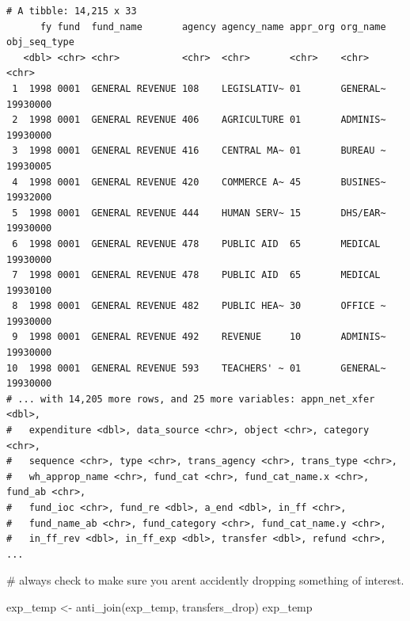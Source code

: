 \documentclass[
  letterpaper,
  DIV=11,
  numbers=noendperiod]{scrreport}
\newenvironment{Shaded}{\begin{snugshade}}{\end{snugshade}}
\newcommand{\CommentTok}[1]{\textcolor[rgb]{0.37,0.37,0.37}{#1}}
\newcommand{\FunctionTok}[1]{\textcolor[rgb]{0.28,0.35,0.67}{#1}}
\newcommand{\NormalTok}[1]{\textcolor[rgb]{0.00,0.23,0.31}{#1}}
\newcommand{\OtherTok}[1]{\textcolor[rgb]{0.00,0.23,0.31}{#1}}
\begin{document}
\begin{verbatim}
# A tibble: 14,215 x 33
      fy fund  fund_name       agency agency_name appr_org org_name obj_seq_type
   <dbl> <chr> <chr>           <chr>  <chr>       <chr>    <chr>    <chr>       
 1  1998 0001  GENERAL REVENUE 108    LEGISLATIV~ 01       GENERAL~ 19930000    
 2  1998 0001  GENERAL REVENUE 406    AGRICULTURE 01       ADMINIS~ 19930000    
 3  1998 0001  GENERAL REVENUE 416    CENTRAL MA~ 01       BUREAU ~ 19930005    
 4  1998 0001  GENERAL REVENUE 420    COMMERCE A~ 45       BUSINES~ 19932000    
 5  1998 0001  GENERAL REVENUE 444    HUMAN SERV~ 15       DHS/EAR~ 19930000    
 6  1998 0001  GENERAL REVENUE 478    PUBLIC AID  65       MEDICAL  19930000    
 7  1998 0001  GENERAL REVENUE 478    PUBLIC AID  65       MEDICAL  19930100    
 8  1998 0001  GENERAL REVENUE 482    PUBLIC HEA~ 30       OFFICE ~ 19930000    
 9  1998 0001  GENERAL REVENUE 492    REVENUE     10       ADMINIS~ 19930000    
10  1998 0001  GENERAL REVENUE 593    TEACHERS' ~ 01       GENERAL~ 19930000    
# ... with 14,205 more rows, and 25 more variables: appn_net_xfer <dbl>,
#   expenditure <dbl>, data_source <chr>, object <chr>, category <chr>,
#   sequence <chr>, type <chr>, trans_agency <chr>, trans_type <chr>,
#   wh_approp_name <chr>, fund_cat <chr>, fund_cat_name.x <chr>, fund_ab <chr>,
#   fund_ioc <chr>, fund_re <dbl>, a_end <dbl>, in_ff <chr>,
#   fund_name_ab <chr>, fund_category <chr>, fund_cat_name.y <chr>,
#   in_ff_rev <dbl>, in_ff_exp <dbl>, transfer <dbl>, refund <chr>, ...
\end{verbatim}

\begin{Shaded}
\begin{Highlighting}[]
\CommentTok{\# always check to make sure you aren\textquotesingle{}t accidently dropping something of interest.}

\NormalTok{exp\_temp }\OtherTok{\textless{}{-}} \FunctionTok{anti\_join}\NormalTok{(exp\_temp, transfers\_drop)}
\NormalTok{exp\_temp}
\end{Highlighting}
\end{Shaded}
\end{document}
